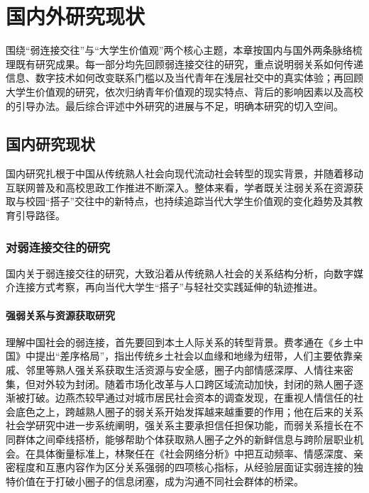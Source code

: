 \section{国内外研究现状}
\label{sec:research-status}

围绕“弱连接交往”与“大学生价值观”两个核心主题，本章按国内与国外两条脉络梳理既有研究成果。每一部分均先回顾弱连接交往的研究，重点说明弱关系如何传递信息、数字技术如何改变联系门槛以及当代青年在浅层社交中的真实体验；再回顾大学生价值观的研究，依次归纳青年价值观的现实特点、背后的影响因素以及高校的引导办法。最后综合评述中外研究的进展与不足，明确本研究的切入空间。

\subsection{国内研究现状}
\label{sec:domestic-research}

国内研究扎根于中国从传统熟人社会向现代流动社会转型的现实背景，并随着移动互联网普及和高校思政工作推进不断深入。整体来看，学者既关注弱关系在资源获取与校园“搭子”交往中的新特点，也持续追踪当代大学生价值观的变化趋势及其教育引导路径。

\subsubsection{对弱连接交往的研究}

国内关于弱连接交往的研究，大致沿着从传统熟人社会的关系结构分析，向数字媒介连接方式考察，再向当代大学生“搭子”与轻社交实践延伸的轨迹推进。

\paragraph{强弱关系与资源获取研究}
理解中国社会的弱连接，首先要回到本土人际关系的转型背景。费孝通在《乡土中国》中提出“差序格局”，指出传统乡土社会以血缘和地缘为纽带，人们主要依靠亲戚、邻里等熟人强关系获取生活资源与安全感，圈子内部情感深厚、人情往来密集，但对外较为封闭\cite{Fei2012}。随着市场化改革与人口跨区域流动加快，封闭的熟人圈子逐渐被打破。边燕杰较早通过对城市居民社会资本的调查发现，在重视人情信任的社会底色之上，跨越熟人圈子的弱关系开始发挥越来越重要的作用\cite{ZSHK200403011}；他在后来的关系社会学研究中进一步系统阐明，强关系主要承担信任担保功能，而弱关系擅长在不同群体之间牵线搭桥，能够帮助个体获取熟人圈子之外的新鲜信息与跨阶层职业机会\cite{Bian2021}。在具体衡量标准上，林聚任在《社会网络分析》中把互动频率、情感深度、亲密程度和互惠内容作为区分关系强弱的四项核心指标，从经验层面证实弱连接的独特价值在于打破小圈子的信息闭塞，成为沟通不同社会群体的桥梁\cite{Lin2009}。


